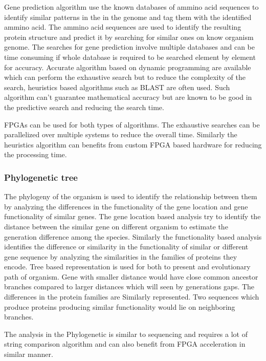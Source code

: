 \documentclass[12pt,twoside]{article}
\begin{document}
Gene prediction algorithm use the known databases of ammino acid sequences to identify similar patterns in the
in the genome and tag them with the identified ammino acid. The ammino acid sequences are used to identify
the resulting protein structure and predict it by searching for similar ones on know organism genome. The searches
for gene prediction involve multiple databases and can be time consuming if whole database is required to be
searched element by element for accuracy. Accurate algorithm based on dynamic programming are available which
can perform the exhaustive search but to reduce the complexity of the search, heuristics based algorithms
such as BLAST \cite{altschul_basic_1990} are often used. Such algorithm can't guarantee mathematical accuracy
but are known to be good in the predictive search and reducing the search time.

FPGAs can be used for both types of algorithms. The exhaustive searches can be parallelized over multiple systems
to reduce the overall time. Similarly the heuristics algorithm can benefits from custom FPGA based hardware for
reducing the processing time.

\subsubsection{Phylogenetic tree}

The phylogeny of the organism is used to identify the relationship between them by analyzing the differences in the
functionality of the gene location and gene functionality of similar genes. The gene location based analysis try
to identify the distance between the similar gene on different organism to estimate the generation difference among the
species. Similarly the functionality based analysis identifies the difference or similarity in the functionality of
similar or different gene sequence by analyzing the similarities in the families of proteins they encode.
Tree based representation is used for both to
present and evolutionary path of organism. Gene with smaller distance would have close common ancestor branches compared to
larger distances which will seen by generations gaps. The differences in the protein families are Similarly represented.
Two sequences which produce proteins producing similar functionality would lie on neighboring branches.

The analysis in the Phylogenetic is similar to sequencing and requires a lot of string comparison algorithm and can also
benefit from FPGA acceleration in similar manner.
\end{document}
